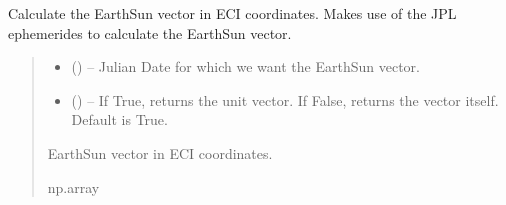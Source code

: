 \documentclass[letterpaper,10pt,english]{sphinxmanual}
\begin{document}

\begin{fulllineitems}
\label{\detokenize{fspsim.utils:fspsim.utils.Conversions.earth_sun_vec}}
\pysigstartsignatures
{}
\pysigstopsignatures
\sphinxAtStartPar
Calculate the Earth\sphinxhyphen{}Sun vector in ECI coordinates.
Makes use of the JPL ephemerides to calculate the Earth\sphinxhyphen{}Sun vector.
\begin{quote}\begin{description}
\begin{itemize}
\item {} 
\sphinxAtStartPar
{} () – Julian Date for which we want the Earth\sphinxhyphen{}Sun vector.

\item {} 
\sphinxAtStartPar
{} () – If True, returns the unit vector. If False, returns the vector itself. Default is True.

\end{itemize}

\sphinxAtStartPar
Earth\sphinxhyphen{}Sun vector in ECI coordinates.

\sphinxAtStartPar
np.array

\end{description}\end{quote}

\end{fulllineitems}

\end{document}
